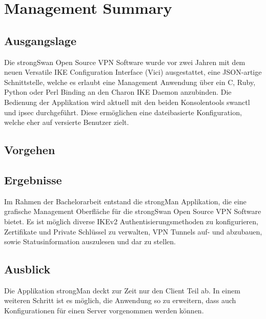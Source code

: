 \section{Management Summary}
\subsection*{Ausgangslage}
Die strongSwan Open Source VPN Software wurde vor zwei Jahren mit dem neuen Versatile
IKE Configuration Interface (Vici) ausgestattet, eine JSON-artige Schnittstelle, welche es erlaubt eine Management Anwendung über ein C, Ruby, Python oder Perl Binding an den Charon
IKE Daemon anzubinden.
Die Bedienung der Applikation wird aktuell mit den beiden Konsolentools swanctl und ipsec durchgeführt. Diese ermöglichen eine dateibasierte Konfiguration, welche eher auf versierte Benutzer zielt. 

\subsection*{Vorgehen}



\subsection*{Ergebnisse}
Im Rahmen der Bachelorarbeit entstand die strongMan Applikation, die eine grafische Management Oberfläche für die strongSwan Open Source VPN Software bietet. Es ist möglich diverse IKEv2 Authentisierungsmethoden zu konfigurieren, Zertifikate und Private Schlüssel zu verwalten, VPN Tunnels auf- und abzubauen, sowie Statusinformation auszulesen und dar zu stellen.


\subsection*{Ausblick}
Die Applikation strongMan deckt zur Zeit nur den Client Teil ab. In einem weiteren Schritt ist es möglich, die Anwendung so zu erweitern, dass auch Konfigurationen für einen Server vorgenommen werden können.
\newpage